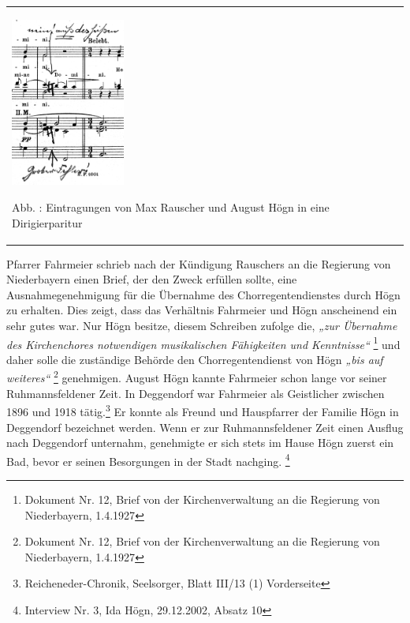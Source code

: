 \documentclass[a4paper]{article}
\newcommand\textstyleZitate[1]{\textit{#1}}
\newcommand\textstyleFunotenTextZchn[1]{#1}
\newcounter{Abb}
\renewcommand\theAbb{\arabic{Abb}}
\begin{document}
\begin{center}
\begin{minipage}{4.142cm}
\begin{flushleft}
\tablefirsthead{}
\tablehead{}
\tabletail{}
\tablelasttail{}
\begin{supertabular}{m{3.9420002cm}}

\includegraphics[width=3.759cm,height=5.547cm]{pictures/zulassungsarbeit-img028.png}

\label{bkm:Ref100166968}Abb. \stepcounter{Abb}{\theAbb}: Eintragungen
von Max Rauscher und August Högn in eine Dirigierparitur\\
\end{supertabular}
\end{flushleft}
\end{minipage}
\end{center}
Pfarrer Fahrmeier schrieb nach der Kündigung Rauschers an die Regierung
von Niederbayern einen Brief, der den Zweck erfüllen sollte, eine
Ausnahmegenehmigung für die Übernahme des Chorregentendienstes durch
Högn zu erhalten. Dies zeigt, dass das Verhältnis Fahrmeier und Högn
anscheinend ein sehr gutes war. Nur Högn besitze, diesem Schreiben
zufolge die, \textstyleZitate{„zur Übernahme des Kirchenchores
notwendigen musikalischen Fähigkeiten und Kenntnisse“ }\footnote{
Dokument Nr. 12, Brief von der Kirchenverwaltung an die Regierung von
Niederbayern, 1.4.1927} und daher solle die zuständige Behörde den
Chorregentendienst von Högn \textstyleZitate{„bis auf weiteres“
} \footnote{Dokument Nr. 12, Brief von der Kirchenverwaltung an die
Regierung von Niederbayern, 1.4.1927} genehmigen. August Högn kannte
Fahrmeier schon lange vor seiner Ruhmannsfeldener Zeit. In Deggendorf
war Fahrmeier als Geistlicher zwischen 1896 und 1918 tätig.\footnote{
Reicheneder-Chronik, \textstyleFunotenTextZchn{Seelsorger, Blatt III/13
(1) Vorderseite}} Er konnte als Freund und Hauspfarrer der Familie Högn
in Deggendorf bezeichnet werden. Wenn er zur Ruhmannsfeldener Zeit
einen Ausflug nach Deggendorf unternahm, genehmigte er sich stets im
Hause Högn zuerst ein Bad, bevor er seinen Besorgungen in der Stadt
nachging. \footnote{Interview Nr. 3, Ida Högn, 29.12.2002, Absatz 10}
\end{document}
